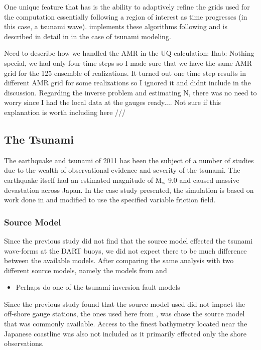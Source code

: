 One unique feature that \geoclaw has is the ability to adaptively refine the grids used for the computation essentially following a region of interest as time progresses (in this case, a tsunami wave).  \geoclaw implements these algorithms following \cite{Berger:1984ui,Berger:1998aa} and is described in detail in \cite{Berger:2011du} in the case of tsunami modeling.

\alert{Need to describe how we handled the AMR in the UQ calculation: Ihab: Nothing special, we had only four time
steps so I made sure that we have the same AMR grid for the 125 ensemble of realizations. It turned out
one time step results in different AMR grid for some realizations so I ignored it and didnt include in the discussion.
Regarding the inverse problem and estimating N, there was no need to worry since I had the local data
at the gauges ready.... Not sure if this explanation is worth including here ///}

\subsection{The \tohoku Tsunami} \label{ssub:tohoku}

The \tohoku earthquake and tsunami of 2011 has been the subject of a number of studies due to the wealth of observational evidence and severity of the tsunami.  The earthquake itself had an estimated magnitude of $\text{M}_\text{w}$ 9.0 and caused massive devastation across Japan.  In the case study presented, the simulation is based on work done in \cite{MacInnes:2013cr} and modified to use the specified variable friction field.


\subsubsection{Source Model}

Since the previous study \cite{MacInnes:2013cr} did not find that the source model effected the tsunami wave-forms at the DART buoys, we did not expect there to be much difference between the available models.  After comparing the same analysis with two different source models, namely the models from \cite{Ammon:2011dm} and

\begin{itemize}
    \item Perhaps do one of the tsunami inversion fault models
\end{itemize}

Since the previous study found that the source model used did not impact the off-shore gauge stations, the ones used here from \cite{Ammon:2011dm}, was chose the source model that was commonly available.  Access to the finest bathymetry located near the Japanese coastline was also not included as it primarily effected only the shore observations.

